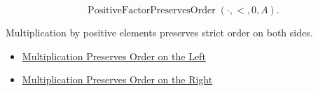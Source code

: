 \begin{remark*}
\[
\operatorname{PositiveFactorPreservesOrder}(\cdot,<,0,A).
\]
\end{remark*}

\begin{remark*}[Interpretation]
Multiplication by positive elements preserves strict order on both sides.
\end{remark*}

\begin{dependencies}
\begin{itemize}
  \item \hyperref[prop:multiplication-order-compatibility-left]{Multiplication Preserves Order on the Left}
  \item \hyperref[prop:multiplication-order-compatibility-right]{Multiplication Preserves Order on the Right}
\end{itemize}
\end{dependencies}
